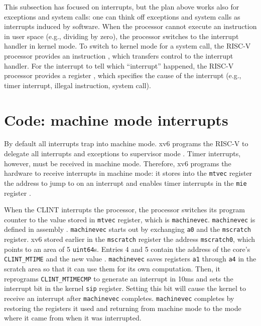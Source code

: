 This subsection has focused on interrupts, but the plan above works
also for exceptions and system calls: one can think off exceptions and
system calls as interrupts induced by software.  When the processor
cannot execute an instruction in user space (e.g., dividing by zero),
the processor switches to the interrupt handler in kernel mode.  To
switch to kernel mode for a system call, the RISC-V processor provides
an instruction , which
transfers control to the interrupt handler.  For the interrupt to tell
which ``interrupt'' happened, the RISC-V processor provides a register
, which specifies
the cause of the interrupt (e.g., timer interrupt, illegal
instruction, system call).


\section{Code: machine mode interrupts}

By default all interrupts trap into machine mode.  xv6 programs the
RISC-V to delegate all interrupts and exceptions to supervisor mode
.
Timer interrupts, however, must be received in machine
mode. Therefore, xv6 programs the hardware to receive interrupts in
machine mode: it stores into the \lstinline{mtvec} register the
address to jump to on an interrupt 
and enables timer interrupts in the \lstinline{mie} register
.

When the CLINT interrupts the processor, the processor switches its
program counter to the value stored in \lstinline{mtvec} register,
which is \lstinline{machinevec}.  \lstinline{machinevec} is defined in
assembly .
\lstinline{machinevec} starts out by exchanging \lstinline{a0} and the
\lstinline{mscratch} register.  xv6 stored earlier in the
\lstinline{mscratch} register  the
address \lstinline{mscratch0}, which points to an area of 5
\lstinline{uint64}s.  Entries 4 and 5 contain the address of the
core's \lstinline{CLINT_MTIME} and the new value
.
\lstinline{machinevec} saves registers \lstinline{a1} through
\lstinline{a4} in the scratch area so that it can use them for its own
computation.  Then, it reprograms \lstinline{CLINT_MTIMECMP} to
generate an interrupt in 10ms and sets the interrupt bit in the kernel
\lstinline{sip} register.  Setting this bit will cause the kernel to
receive an interrupt after \lstinline{machinevec} completes.
\lstinline{machinevec} completes by restoring the registers it used
and returning from machine mode  to
the mode where it came from when it was interrupted.

